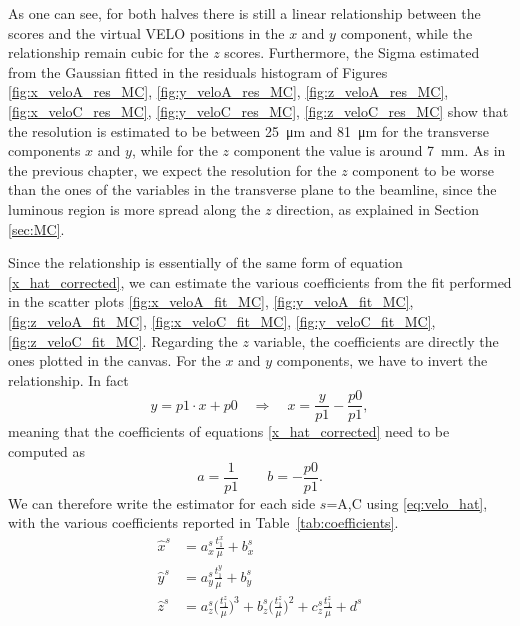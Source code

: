 As one can see, for both halves there is still a linear relationship between the scores and the virtual VELO positions in the $x$ and $y$ component, while the relationship remain cubic for the $z$ scores.  Furthermore, the Sigma estimated from the Gaussian fitted in the residuals histogram of Figures \ref{fig:x_veloA_res_MC}, \ref{fig:y_veloA_res_MC}, \ref{fig:z_veloA_res_MC}, \ref{fig:x_veloC_res_MC}, \ref{fig:y_veloC_res_MC}, \ref{fig:z_veloC_res_MC} show that the resolution is estimated to be between \SI{25}{\micro\meter} and \SI{81}{\micro\meter} for the transverse components $x$ and $y$, while for the $z$ component the value is around \SI{7}{\milli\meter}. As in the previous chapter, we expect the resolution for the $z$ component to be worse than the ones of the variables in the transverse plane to the beamline, since the luminous region is more spread along the $z$ direction, as explained in Section \ref{sec:MC}.

Since the relationship is essentially of the same form of equation \eqref{x_hat_corrected}, we can estimate the various coefficients from the fit performed in the scatter plots \ref{fig:x_veloA_fit_MC}, \ref{fig:y_veloA_fit_MC}, \ref{fig:z_veloA_fit_MC}, \ref{fig:x_veloC_fit_MC}, \ref{fig:y_veloC_fit_MC}, \ref{fig:z_veloC_fit_MC}. Regarding the $z$ variable, the coefficients are directly the ones plotted in the canvas. For the $x$ and $y$ components, we have to invert the relationship. In fact
\begin{equation}
    y = p1\cdot x +p0 \quad  \Longrightarrow \quad  x = \frac{y}{p1}-\frac{p0}{p1},
\end{equation}
meaning that the coefficients of equations \eqref{x_hat_corrected} need to be computed as 
\begin{equation}
    a = \frac{1}{p1} \qquad b = -\frac{p0}{p1}.
\end{equation}
We can therefore write the estimator for each side $s$=A,C using \eqref{eq:velo_hat}, with the various coefficients reported in Table~\ref{tab:coefficients}.
\begin{equation}
\begin{split}
    \hat{x}^{s} &= a_x^s \frac{t^x_1}{\mu} + b_x^s\\%
    \hat{y}^{s} &=a_y^s \frac{t^y_1}{\mu} + b_y^s \\%
    \hat{z}^{s} &=a_z^s\biggl(\frac{t^z_1}{\mu}\biggr)^3 + b_z^s\biggl(\frac{t^z_1}{\mu}\biggr)^2 + c_z^s \frac{t^z_1}{\mu} + d^s
    \end{split} \label{eq:velo_hat}
    \end{equation}
    
